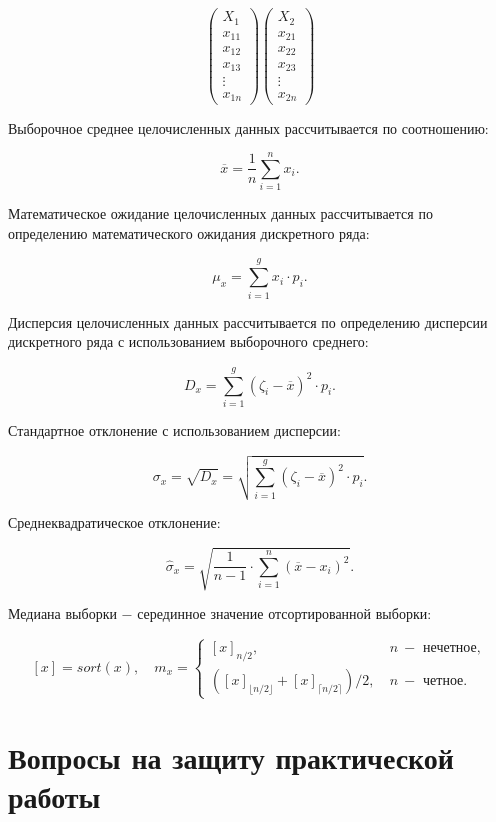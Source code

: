 \documentclass[
]{article}
\begin{document}
\[
\begin{pmatrix}
X_1\\
x_{11} \\
x_{12} \\
x_{13} \\
\vdots \\
x_{1n}
\end{pmatrix} 
\begin{pmatrix}
X_2\\
x_{21} \\
x_{22} \\
x_{23} \\
\vdots \\
x_{2n}
\end{pmatrix}
\]

Выборочное среднее целочисленных данных рассчитывается по соотношению:

\[
\overline{x} = \frac{1}{n} \sum\limits_{i=1}^{n} x_i.
\]

Математическое ожидание целочисленных данных рассчитывается по
определению математического ожидания дискретного ряда:

\[
\mu_x = \sum\limits_{i=1}^{g} x_i \cdot p_i.
\]

Дисперсия целочисленных данных рассчитывается по определению дисперсии
дискретного ряда с использованием выборочного среднего:

\[
D_x = \sum\limits_{i=1}^{g}\left( \zeta_i - \overline{x}  \right)^2 \cdot p_i.
\]

Стандартное отклонение с использованием дисперсии:

\[
\sigma_x = \sqrt{D_x} = \sqrt{\sum\limits_{i=1}^{g}\left( \zeta_i - \overline{x}  \right)^2 \cdot p_i}.
\]

Среднеквадратическое отклонение:

\[
\hat{\sigma}_x = \sqrt{\frac{1}{n-1} \cdot \sum\limits_{i=1}^{n}(\overline{x} - x_i)^2}.
\]

Медиана выборки \(-\) серединное значение отсортированной выборки:

\[
[x] = sort(x),\quad 
m_x = \left\{
\begin{matrix}
[x]_{n/2}, & \ n\  - \text{ нечетное}, \\ 
\left([x]_{\lfloor n/2 \rfloor} + [x]_{\lceil n/2 \rceil}\right)/2, & \ n\  - \text{ четное}.
\end{matrix}
\right.
\]

\hypertarget{ux432ux43eux43fux440ux43eux441ux44b-ux43dux430-ux437ux430ux449ux438ux442ux443-ux43fux440ux430ux43aux442ux438ux447ux435ux441ux43aux43eux439-ux440ux430ux431ux43eux442ux44b}{%
\section{\texorpdfstring{\textbf{Вопросы на защиту практической
работы}}{Вопросы на защиту практической работы}}\label{ux432ux43eux43fux440ux43eux441ux44b-ux43dux430-ux437ux430ux449ux438ux442ux443-ux43fux440ux430ux43aux442ux438ux447ux435ux441ux43aux43eux439-ux440ux430ux431ux43eux442ux44b}}
\end{document}

